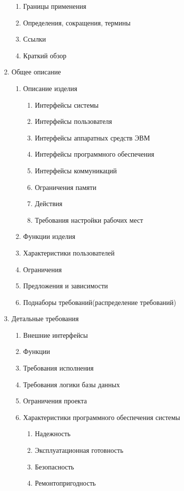 \documentclass[12pt]{article} %
\begin{document}
\begin{enumerate}
\begin{enumerate}
        \item Границы применения
        \item Определения, сокращения, термины
        \item Ссылки
        \item Краткий обзор
    \end{enumerate} 
  \item  Общее описание
  	\begin{enumerate}
  		\item Описание изделия
  			\begin{enumerate}
  				\item Интерфейсы системы
  				\item Интерфейсы пользователя
  				\item Интерфейсы аппаратных средств ЭВМ
  				\item Интерфейсы программного обеспечения
  				\item Интерфейсы коммуникаций
  				\item Ограничения памяти
  				\item Действия
  				\item Требования настройки рабочих мест
  			\end{enumerate}
  		\item Функции изделия
  		\item Характеристики пользователей
  		\item Ограничения
  		\item Предложения и зависимости
  		\item Поднаборы требований(распределение требований)
  	\end{enumerate}
  \item Детальные требования
  	\begin{enumerate}
  		\item Внешние интерфейсы
  		\item Функции
  		\item Требования исполнения
  		\item Требования логики базы данных
  		\item Ограничения проекта
  		\item Характеристики программного обеспечения системы
  			\begin{enumerate}
  				\item Надежность
  				\item Эксплуатационная готовность
  				\item Безопасность
  				\item Ремонтопригодность

\end{enumerate}
\end{enumerate}
\end{enumerate}
\end{document}
